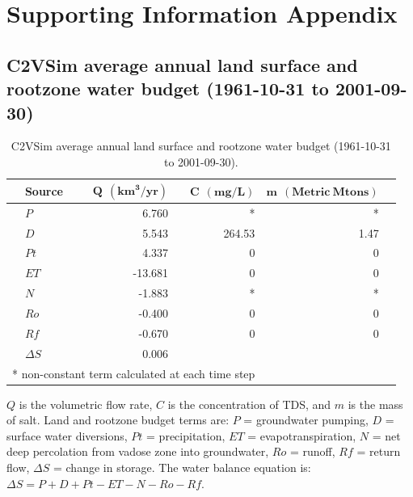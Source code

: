 \section{Supporting Information Appendix} 
\label{ap_b_abcsal}


\subsection{C2VSim average annual land surface and rootzone water budget (1961-10-31 to 2001-09-30)}


\bgroup

\renewcommand{\arraystretch}{1.5}

\setlength{\tabcolsep}{1.3em}

\centering
\begin{threeparttable}
	\begin{table}[H]
		\caption{C2VSim average annual land surface and rootzone water budget (1961-10-31 to 2001-09-30).}
		
		\begin{tabular}{rlrrrr}
			
			
			
			& \textbf{Source} & $\bm{Q \: \: (km^3/yr)}$ & $\bm{C \: \: (mg/L)}$ & $\bm{m \: \: (Metric \: Mtons)}$ & \\ 
			\hline
			& $P$ & 6.760 & * & * & \\ 
			& $D$ & 5.543 & 264.53 & 1.47 & \\ 
			& $Pt$ & 4.337 & 0 & 0 & \\ 
			& $ET$ & -13.681 & 0 & 0 & \\ 
			& $N$ & -1.883 & * & * & \\ 
			& $Ro$ & -0.400 & 0 & 0 & \\
			& $Rf$ & -0.670 & 0 & 0 & \\
			& $\Delta S$ & 0.006 &  &  & \\ 
			\hline
			\multicolumn{4}{l}{\scriptsize{* non-constant term calculated at each time step}} 
		\end{tabular}
		
		$Q$ is the volumetric flow rate, $C$ is the concentration of TDS, and $m$ is the mass of salt. Land and rootzone budget terms are: 
		$P$ = groundwater pumping, 
		$D$ = surface water diversions,
		$Pt$ = precipitation,
		$ET$ = evapotranspiration,
		$N$ = net deep percolation from vadose zone into groundwater,
		$Ro$ = runoff,
		$Rf$ = return flow,
		$\Delta S$ = change in storage. 
		The water balance equation is: $\Delta S = P + D + Pt - ET - N - Ro - Rf$.  
		
		\label{ap_b_lsb}
	\end{table}
	
\end{threeparttable}


